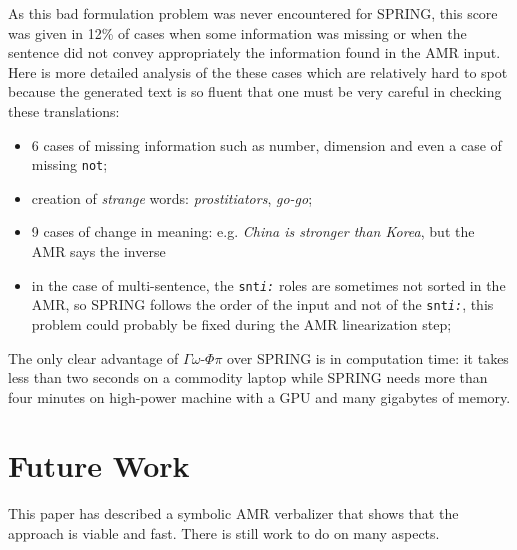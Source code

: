 \documentclass[12pt]{article}
\newcommand{\systeme}[1]{\textsc{#1}}
\newcommand{\gophipy}{$\Gamma\omega$-$\Phi\pi$}
\newcommand{\spring}{\systeme{SPRING}}
\newcommand{\representation}[1]{\textsf{#1}}
\newcommand{\AMR}{\representation{AMR}}
\begin{document}
As this bad formulation problem was never encountered for \spring{}, this score was given in 12\% of cases when some information was missing or when the sentence did not convey appropriately the information found in the \AMR{} input.
Here is more detailed analysis of the these cases which are relatively hard to spot because the generated text is so fluent that one must be very careful in checking these translations:
\begin{itemize}
    \item 6 cases of missing information such as number, dimension and even a case of missing \texttt{not};
    \item creation of \emph{strange} words: \emph{prostitiators}, \emph{go-go};
    \item 9 cases of change in meaning: e.g. \emph{China is stronger than Korea}, but the \AMR{} says the inverse
    \item in the case of multi-sentence, the \texttt{snt\emph{i:}} roles are sometimes not sorted in the \AMR{}, so \spring{} follows the order of the input and not of the \texttt{snt\emph{i:}}, this problem could probably be fixed during the \AMR{} linearization step;
\end{itemize}

The only clear advantage of \gophipy{} over \spring{} is in computation time: it takes less than two seconds on a commodity laptop while \spring{} needs more than four minutes on high-power machine with a GPU and many gigabytes of memory.


\section{Future Work} %
\label{sec:future_work}

This paper has described a symbolic \AMR{} verbalizer that shows that the approach is viable and fast. There is still work to do on many aspects.

%
\end{document}
